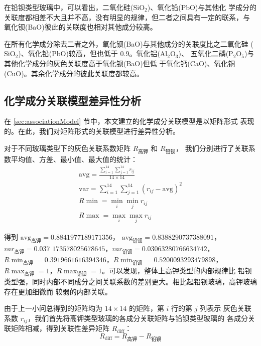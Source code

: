 \documentclass[withoutpreface,bwprint]{cumcmthesis} %
\begin{document}
在铅钡类型玻璃中，可以看出，二氧化硅($\mathrm{SiO_2}$)、氧化铅(PbO)与其他化
学成分的关联度都相差不大且并不高，没有明显的规律，但二者之间具有一定的联系，与
氧化钡(BaO)彼此的关联度也相对其他成分较高。

在所有化学成分除去二者之外，氧化钡(BaO)与其他成分的关联度比之二氧化硅
($\mathrm{SiO_2}$)、氧化铅(PbO)较高，但也低于 0.9。氧化铝($\mathrm{Al_2O_3}$)、
五氧化二磷($\mathrm{P_2O_5}$)与其他化学成分的灰色关联度高于氧化钡(BaO)但低
于氧化钙(CaO)、氧化铜(CuO)。其余化学成分的彼此关联度都较高。

\subsection{化学成分关联模型差异性分析}
在 \ref{sec:associationModel} 节中，本文建立的化学成分关联模型是以矩阵形式
表现的。在此，我们对矩阵形式的关联模型进行差异性分析。

对于不同玻璃类型下的灰色关联系数矩阵 $R_{\text{高钾}}$ 和 $R_{\text{铅钡}}$，
我们分别进行了关联系数平均值、方差、最小值、最大值的统计：
\begin{gather*}
    \mathrm{avg}=\frac{\sum_{i=1}^{14}\sum_{j=1}^{14}r_{ij}}
    {14\times 14} \\
    \mathrm{var}=\sum_{i=1}^{14}\sum_{j=1}^{14}(r_{ij}-\mathrm{avg})^2 \\
    R\min = \min_i\min_jr_{ij} \\
    R\max = \max_i\max_jr_{ij}
\end{gather*}

得到 $\mathrm{avg}_{\text{高钾}}=0.8841977189171356$，
$\mathrm{avg}_{\text{铅钡}}=0.8388290737388091$，
$var_{\text{高钾}}=0.037$ $173578025678645$，$var_{\text{铅钡}}=0.03063280766634742$，
$R\min_{\text{高钾}}=0.3919661616394346$，$R\min_{\text{铅钡}}=0.5200093293479898$，
$R\max_{\text{高钾}}=1$，$R\max_{\text{铅钡}}=1$。可以发现，整体上高钾类型的内部规律比
铅钡类型强，同时内部不同成分之间关联系数的差别更大。相比起铅钡玻璃，高钾玻璃存在更加细微而
较弱的内部关联。

由于上一小问总得到的矩阵均为 $14\times 14$ 的矩阵，第 $i$ 行的第 $j$ 列表示
灰色关联系数 $r_{ij}$，我们首先将高钾类型玻璃的各成分关联矩阵与铅钡类型玻璃的
各成分关联矩阵相减，得到关联性差异矩阵 $R_{\mathrm{diff}}$：
\[
    R_{\mathrm{diff}}=R_{\text{高钾}}-R_{\text{铅钡}}
\]
\end{document}
